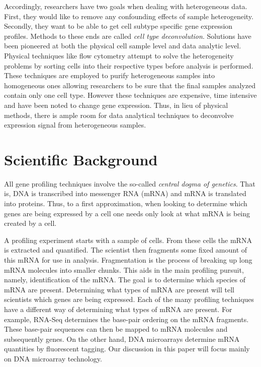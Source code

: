 \documentclass[reqno,12pt,oneside]{report}\usepackage[]{graphicx}\usepackage[]{color}
\theoremstyle{plain}
\theoremstyle{definition}
\theoremstyle{remark}
\numberwithin{theorem}{chapter}     %
\begin{document}
Accordingly, researchers have two goals when dealing with heterogeneous data. First, they would like to remove any confounding effects of sample heterogeneity. Secondly, they want to be able to get cell subtype specific gene expression profiles. Methods to these ends are called \emph{cell type deconvolution}. Solutions have been pioneered at both the physical cell sample level and data analytic level. Physical techniques like flow cytometry attempt to solve the heterogeneity problems by sorting cells into their respective types before analysis is performed. These techniques are employed to purify heterogeneous samples into homogeneous ones allowing researchers to be sure that the final samples analyzed contain only one cell type. However these techniques are expensive, time intensive and have been noted to change gene expression. Thus, in lieu of physical methods, there is ample room for data analytical techniques to deconvolve expression signal from heterogeneous samples. 

 

 \chapter{Scientific Background}
 \label{chap:Science}

All gene profiling techniques involve the so-called \emph{central dogma of genetics}. That is, DNA is transcribed into messenger RNA (mRNA) and mRNA is translated into proteins. Thus, to a first approximation, when looking to determine which genes are being expressed by a cell one needs only look at what mRNA is being created by a cell.

A profiling experiment starts with a sample of cells. From these cells the mRNA is extracted and quantified. The scientist then fragments some fixed amount of this mRNA for use in analysis. Fragmentation is the process of breaking up long mRNA molecules into smaller chunks. This aids in the main profiling pursuit, namely, identification of the mRNA. The goal is to determine which species of mRNA are present. Determining what types of mRNA are present will tell scientists which genes are being expressed. Each of the many profiling techniques have a different way of determining what types of mRNA are present. For example, RNA-Seq determines the base-pair ordering on the mRNA fragments. These base-pair sequences can then be mapped to mRNA molecules and subsequently genes. On the other hand, DNA microarrays determine mRNA quantities by fluorescent tagging. Our discussion in this paper will focus mainly on DNA microarray technology.
\end{document}
